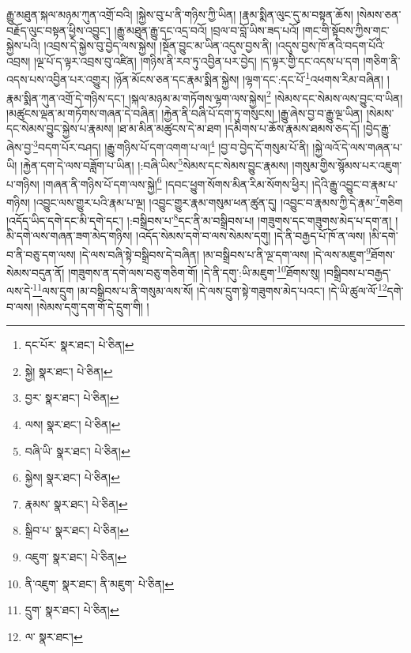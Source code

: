 རྒྱུ་མཐུན་སྐལ་མཉམ་ཀུན་འགྲོ་བའི། །སྐྱེས་བུ་པ་ནི་གཉིས་ཀྱི་ཡིན། །རྣམ་སྨིན་ལུང་དུ་མ་བསྟན་ཆོས། །སེམས་ཅན་བརྗོད་ལུང་བསྟན་ཕྱིས་འབྱུང་། །རྒྱུ་མཐུན་རྒྱུ་དང་འདྲ་བའོ། །བྲལ་བ་བློ་ཡིས་ཟད་པའོ། །གང་གི་སྟོབས་ཀྱིས་གང་སྐྱེས་པའི། །འབྲས་དེ་སྐྱེས་བུ་བྱེད་ལས་སྐྱེས། །སྔོན་བྱུང་མ་ཡིན་འདུས་བྱས་ནི། །འདུས་བྱས་ཁོ་ནའི་བདག་པོའི་འབྲས། །ལྔ་པོ་ད་ལྟར་འབྲས་བུ་འཛིན། །གཉིས་ནི་རབ་ཏུ་འབྱིན་པར་བྱེད། །ད་ལྟར་གྱི་དང་འདས་པ་དག །གཅིག་ནི་འདས་པས་འབྱིན་པར་འགྱུར། །ཉོན་མོངས་ཅན་དང་རྣམ་སྨིན་སྐྱེས། །ལྷག་དང་:དང་པོ་\footnote{དང་པོར་  སྣར་ཐང་།  པེ་ཅིན། }འཕགས་རིམ་བཞིན། །རྣམ་སྨིན་ཀུན་འགྲོ་དེ་གཉིས་དང་། །སྐལ་མཉམ་མ་གཏོགས་ལྷག་ལས་སྐྱེས།\footnote{སྐྱེ།  སྣར་ཐང་།  པེ་ཅིན། } །སེམས་དང་སེམས་ལས་བྱུང་བ་ཡིན། །མཚུངས་ལྡན་མ་གཏོགས་གཞན་དེ་བཞིན། །རྐྱེན་ནི་བཞི་པོ་དག་ཏུ་གསུངས། །རྒྱུ་ཞེས་བྱ་བ་རྒྱུ་ལྔ་ཡིན། །སེམས་དང་སེམས་བྱུང་སྐྱེས་པ་རྣམས། །ཐ་མ་མིན་མཚུངས་དེ་མ་ཐག །དམིགས་པ་ཆོས་རྣམས་ཐམས་ཅད་དོ། །བྱེད་རྒྱུ་ཞེས་བྱ་\footnote{བྱར་  སྣར་ཐང་།  པེ་ཅིན། }བདག་པོར་བཤད། །རྒྱུ་གཉིས་པོ་དག་འགག་པ་ལ།\footnote{ལས།  སྣར་ཐང་།  པེ་ཅིན། } །བྱ་བ་བྱེད་དོ་གསུམ་པོ་ནི། །སྐྱེ་ལའོ་དེ་ལས་གཞན་པ་ཡི། །རྐྱེན་དག་དེ་ལས་བཟློག་པ་ཡིན། །:བཞི་ཡིས་\footnote{བཞི་ཡི་  སྣར་ཐང་།  པེ་ཅིན། }སེམས་དང་སེམས་བྱུང་རྣམས། །གསུམ་གྱིས་སྙོམས་པར་འཇུག་པ་གཉིས། །གཞན་ནི་གཉིས་པོ་དག་ལས་སྐྱེ།\footnote{སྐྱེས།  སྣར་ཐང་།  པེ་ཅིན། } །དབང་ཕྱུག་སོགས་མིན་རིམ་སོགས་ཕྱིར། །དེའི་རྒྱུ་འབྱུང་བ་རྣམ་པ་གཉིས། །འབྱུང་ལས་གྱུར་པའི་རྣམ་པ་ལྔ། །འབྱུང་གྱུར་རྣམ་གསུམ་ཕན་ཚུན་དུ། །འབྱུང་བ་རྣམས་ཀྱི་དེ་རྣམ་\footnote{རྣམས་  སྣར་ཐང་།  པེ་ཅིན། }གཅིག །འདོད་ཡིད་དགེ་དང་མི་དགེ་དང་། །:བསྒྲིབས་པ་\footnote{སྒྲིབ་པ་  སྣར་ཐང་།  པེ་ཅིན། }དང་ནི་མ་བསྒྲིབས་པ། །གཟུགས་དང་གཟུགས་མེད་པ་དག་ན། །མི་དགེ་ལས་གཞན་ཟག་མེད་གཉིས། །འདོད་སེམས་དགེ་བ་ལས་སེམས་དགུ། །དེ་ནི་བརྒྱད་པོ་ཁོ་ན་ལས། །མི་དགེ་བ་ནི་བཅུ་དག་ལས། །དེ་ལས་བཞི་སྟེ་བསྒྲིབས་དེ་བཞིན། །མ་བསྒྲིབས་པ་ནི་ལྔ་དག་ལས། །དེ་ལས་མཇུག་\footnote{འཇུག་  སྣར་ཐང་།  པེ་ཅིན། }ཐོགས་སེམས་བདུན་ནོ། །གཟུགས་ན་དགེ་ལས་བཅུ་གཅིག་གོ། །དེ་ནི་དགུ་:ཡི་མཇུག་\footnote{ནི་འཇུག་  སྣར་ཐང་། ནི་མཇུག་  པེ་ཅིན། }ཐོགས་སུ། །བསྒྲིབས་པ་བརྒྱད་ལས་དེ་\footnote{དྲུག་  སྣར་ཐང་།  པེ་ཅིན། }ལས་དྲུག །མ་བསྒྲིབས་པ་ནི་གསུམ་ལས་སོ། །དེ་ལས་དྲུག་སྟེ་གཟུགས་མེད་པའང་། །དེ་ཡི་ཚུལ་ལོ་\footnote{ལ་  སྣར་ཐང་། }དགེ་བ་ལས། །སེམས་དགུ་དག་གོ་དེ་དྲུག་གི། །
